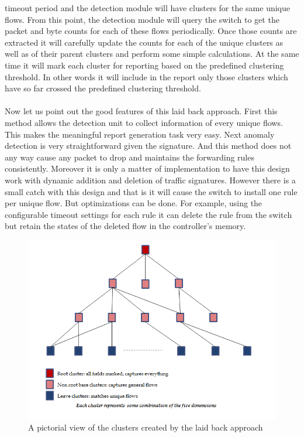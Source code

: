 \documentclass[twocolumn]{article}
\begin{document}
timeout period and the detection module will have clusters for the same unique flows. From this point, the detection module will query the switch to get the packet and byte counts for each of these flows periodically. Once those counts are extracted it will carefully update the counts for each of the unique clusters as well as of their parent clusters and perform some simple calculations. At the same time it will mark each cluster for reporting based on the predefined clustering threshold. In other words it will include in the report only those clusters which have so far crossed the predefined clustering threshold. \\\\
Now let us point out the good features of this laid back approach. First this method allows the detection unit to collect information of every unique flows. This makes the meaningful report generation task very easy. Next anomaly detection is very straightforward given the signature. And this method does not any way cause any packet to drop and maintains the forwarding rules consistently. Moreover it is only a matter of implementation to have this design work with dynamic addition and deletion of traffic signatures. However there is a small catch with this design and that is it will cause the switch to install one rule per unique flow. But optimizations can be done. For example, using the configurable timeout settings for each rule it can delete the rule from the switch but retain the states of the deleted flow in the controller's memory. 
\begin{figure}[!ht]
\centering
	\includegraphics[scale=0.6]{images/clusters.png}
\caption{A pictorial view of the clusters created by the laid back approach}
\label{fig:clusters}
\end{figure}
\end{document}
